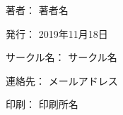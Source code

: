 \clearpage
{}
\begin{flushright}
\begin{minipage}{0.5\hsize}
\begin{description}
  \item{著者：} 著者名
  \item{発行：} 2019年11月18日
  \item{サークル名：} サークル名
  \item{連絡先：} メールアドレス
  \item{印刷：} 印刷所名
\end{description}
\end{minipage}
\end{flushright}
\clearpage